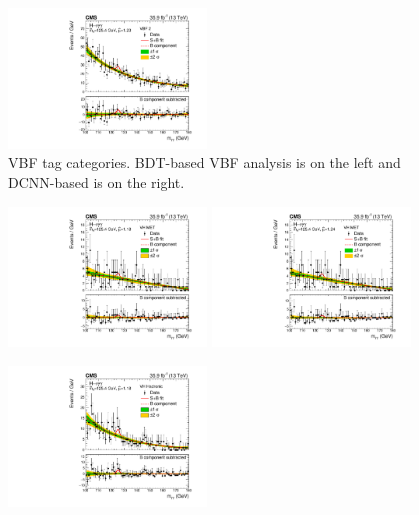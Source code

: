 \begin{figure}[h!]
\begin{center}
        \includegraphics[width=0.47\textwidth]{figures/stats_results/SBplots_jackWSnewVBFTag_2_13TeV.pdf}
    \end{center}
    \caption{VBF tag categories. BDT-based VBF analysis is on the left and DCNN-based is on the right.}
        \label{fig:app_mass_plots:vbf}
\end{figure}

\begin{figure}[h!]
    \begin{center}
        \includegraphics[width=0.47\textwidth]{figures/appendix_mass_plots/CMS-HIG-16-040_Figure_013-d.pdf}
        \includegraphics[width=0.47\textwidth]{figures/appendix_mass_plots/SBplots_jackWSnewOldTTHVHMetTag_13TeV.pdf}
    \end{center}
    \begin{center}
        \includegraphics[width=0.47\textwidth]{figures/appendix_mass_plots/CMS-HIG-16-040_Figure_013-e.pdf}

\end{center}
\end{figure}

